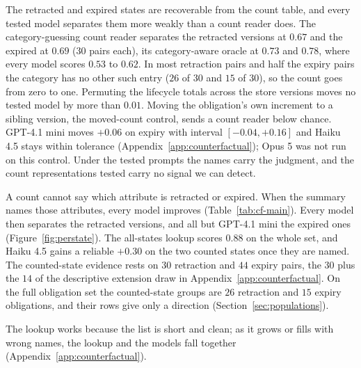 \documentclass{article}
\begin{document}
The retracted and expired states are recoverable from the count table, and every tested model separates them more weakly than a count reader does.
The category-guessing count reader separates the retracted versions at $0.67$ and the expired at $0.69$ ($30$ pairs each), its category-aware oracle at $0.73$ and $0.78$, where every model scores $0.53$ to $0.62$.
In most retraction pairs and half the expiry pairs the category has no other such entry ($26$ of $30$ and $15$ of $30$), so the count goes from zero to one.
Permuting the lifecycle totals across the store versions moves no tested model by more than $0.01$.
Moving the obligation's own increment to a sibling version, the moved-count control, sends a count reader below chance.
GPT-4.1 mini moves $+0.06$ on expiry with interval $[-0.04,+0.16]$ and Haiku 4.5 stays within tolerance (Appendix~\ref{app:counterfactual}); Opus 5 was not run on this control.
Under the tested prompts the names carry the judgment, and the count representations tested carry no signal we can detect.

A count cannot say which attribute is retracted or expired.
When the summary names those attributes, every model improves (Table~\ref{tab:cf-main}).
Every model then separates the retracted versions, and all but GPT-4.1 mini the expired ones (Figure~\ref{fig:perstate}).
The all-states lookup scores $0.88$ on the whole set, and Haiku 4.5 gains a reliable $+0.30$ on the two counted states once they are named.
The counted-state evidence rests on $30$ retraction and $44$ expiry pairs, the $30$ plus the $14$ of the descriptive extension draw in Appendix~\ref{app:counterfactual}.
On the full obligation set the counted-state groups are $26$ retraction and $15$ expiry obligations, and their rows give only a direction (Section~\ref{sec:populations}).

The lookup works because the list is short and clean; as it grows or fills with wrong names, the lookup and the models fall together (Appendix~\ref{app:counterfactual}).
\end{document}
